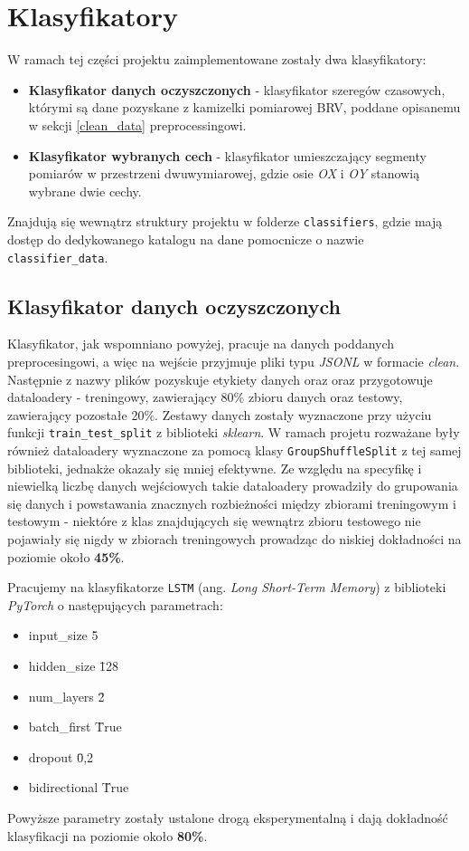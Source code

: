 \section{Klasyfikatory} %
W ramach tej części projektu zaimplementowane zostały dwa klasyfikatory:
\begin{itemize}
    \item {
        \textbf{Klasyfikator danych oczyszczonych} - klasyfikator szeregów czasowych, którymi są
        dane pozyskane z kamizelki pomiarowej BRV, poddane opisanemu w sekcji \ref{clean_data} 
        preprocessingowi.
    }
    \item {
        \textbf{Klasyfikator wybranych cech} - klasyfikator umieszczający segmenty pomiarów w
        przestrzeni dwuwymiarowej, gdzie osie \textit{OX} i \textit{OY} stanowią wybrane dwie cechy.
    }
\end{itemize}
Znajdują się wewnątrz struktury projektu w folderze \verb|classifiers|, gdzie mają dostęp do 
dedykowanego katalogu na dane pomocnicze o nazwie \verb|classifier_data|.

\subsection{Klasyfikator danych oczyszczonych}
Klasyfikator, jak wspomniano powyżej, pracuje na danych poddanych preprocesingowi, a więc na 
wejście przyjmuje pliki typu \textit{JSONL} w formacie \textit{clean}. Następnie z nazwy plików
pozyskuje etykiety danych oraz oraz przygotowuje dataloadery - treningowy, zawierający 80\% 
zbioru danych oraz testowy, zawierający pozostałe 20\%. Zestawy danych zostały wyznaczone przy
użyciu funkcji \verb|train_test_split| z biblioteki \textit{sklearn}. W ramach projetu rozważane 
były również dataloadery wyznaczone za pomocą klasy \verb|GroupShuffleSplit| z tej samej biblioteki, 
jednakże okazały się mniej efektywne. Ze względu na specyfikę i niewielką liczbę danych 
wejściowych  takie dataloadery prowadziły do grupowania się danych i powstawania znacznych 
rozbieżności między zbiorami treningowym i testowym - niektóre z klas znajdujących się 
wewnątrz zbioru testowego nie pojawiały się nigdy w zbiorach treningowych prowadząc do 
niskiej dokładności na poziomie około \textbf{45\%}.

Pracujemy na klasyfikatorze \verb|LSTM| (ang. \textit{Long Short-Term Memory}) z biblioteki
\textit{PyTorch} o następujących parametrach: 
\begin{itemize}
    \item {input\_size \= 5}
    \item {hidden\_size \= 128}
    \item {num\_layers \= 2}
    \item {batch\_first \= True}
    \item {dropout \= 0,2}
    \item {bidirectional \= True}
\end{itemize}
Powyższe parametry zostały ustalone drogą eksperymentalną i dają dokładność klasyfikacji
na poziomie około \textbf{80\%}.

